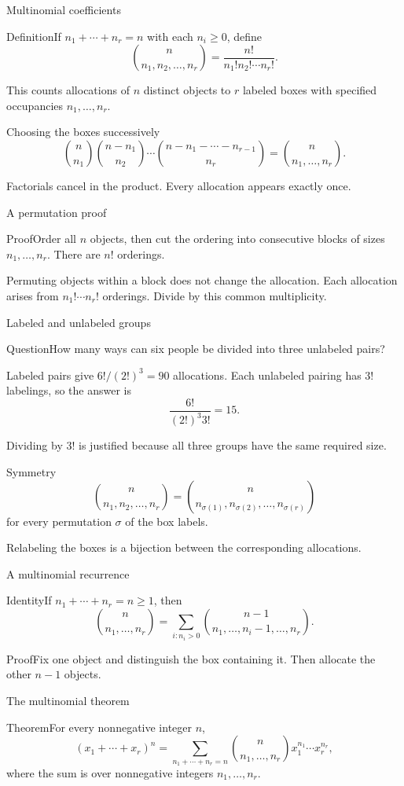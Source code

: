 \documentclass[aspectratio=169,11pt]{beamer}
\newcommand{\Def}[2]{\begin{block}{#1}#2\end{block}}
\newcommand{\Thm}[2]{\begin{block}{#1}#2\end{block}}
\renewcommand{\Proof}[1]{\begin{block}{Proof}\normalsize #1\end{block}}
\newcommand{\Question}[1]{\begin{block}{Question}#1\end{block}}
\newcommand{\gap}{\par\medskip}
\begin{document}
\begin{frame}{Multinomial coefficients}
\large
\Def{Definition}{If $n_1+\cdots+n_r=n$ with each $n_i\geq0$, define
\[\binom n{n_1,n_2,\ldots,n_r}=\frac{n!}{n_1!n_2!\cdots n_r!}.\]}
\gap This counts allocations of $n$ distinct objects to $r$ labeled boxes with specified occupancies $n_1,\ldots,n_r$.
\end{frame}
\begin{frame}{Choosing the boxes successively}
\large
\[\binom n{n_1}\binom{n-n_1}{n_2}\cdots
\binom{n-n_1-\cdots-n_{r-1}}{n_r}
=\binom n{n_1,\ldots,n_r}.\]
\gap Factorials cancel in the product. Every allocation appears exactly once.
\end{frame}
\begin{frame}{A permutation proof}
\large
\Proof{Order all $n$ objects, then cut the ordering into consecutive blocks of sizes $n_1,\ldots,n_r$. There are $n!$ orderings.\gap Permuting objects within a block does not change the allocation. Each allocation arises from $n_1!\cdots n_r!$ orderings. Divide by this common multiplicity.}
\end{frame}
\begin{frame}{Labeled and unlabeled groups}
\large
\Question{How many ways can six people be divided into three unlabeled pairs?}
\gap Labeled pairs give $6!/(2!)^3=90$ allocations. Each unlabeled pairing has $3!$ labelings, so the answer is
\[\frac{6!}{(2!)^3 3!}=15.\]
\gap Dividing by $3!$ is justified because all three groups have the same required size.
\end{frame}
\begin{frame}{Symmetry}
\large
\[\binom n{n_1,n_2,\ldots,n_r}
=\binom n{n_{\sigma(1)},n_{\sigma(2)},\ldots,n_{\sigma(r)}}\]
for every permutation $\sigma$ of the box labels.
\gap Relabeling the boxes is a bijection between the corresponding allocations.
\end{frame}
\begin{frame}{A multinomial recurrence}
\large
\Thm{Identity}{If $n_1+\cdots+n_r=n\geq1$, then
\[\binom n{n_1,\ldots,n_r}
=\sum_{i:n_i>0}\binom{n-1}{n_1,\ldots,n_i-1,\ldots,n_r}.\]}
\Proof{Fix one object and distinguish the box containing it. Then allocate the other $n-1$ objects.}
\end{frame}
\begin{frame}{The multinomial theorem}
\large
\Thm{Theorem}{For every nonnegative integer $n$,
\[(x_1+\cdots+x_r)^n=
\sum_{n_1+\cdots+n_r=n}\binom n{n_1,\ldots,n_r}x_1^{n_1}\cdots x_r^{n_r},\]
where the sum is over nonnegative integers $n_1,\ldots,n_r$.}
\end{frame}
\end{document}
